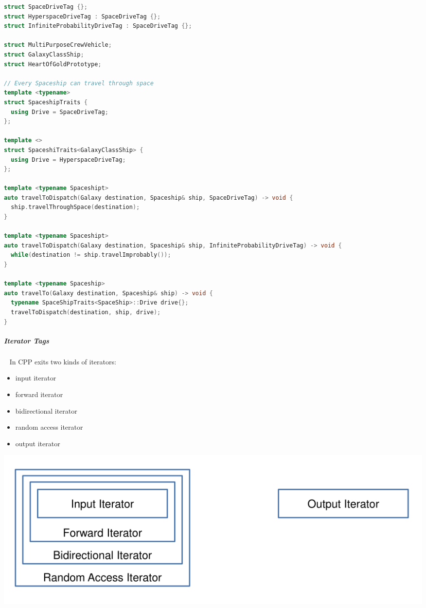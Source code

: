 \documentclass[11pt,twoside,landscape]{article}
\begin{document}
\begin{multicols}{2}
\begin{lstlisting}[language=c++,label=lst:orgdc64eac,caption={Tag for dispatching example},captionpos=b,numbers=none]
struct SpaceDriveTag {};
struct HyperspaceDriveTag : SpaceDriveTag {};
struct InfiniteProbabilityDriveTag : SpaceDriveTag {};

struct MultiPurposeCrewVehicle;
struct GalaxyClassShip;
struct HeartOfGoldPrototype;

// Every Spaceship can travel through space
template <typename>
struct SpaceshipTraits {
  using Drive = SpaceDriveTag;
};

template <>
struct SpaceshiTraits<GalaxyClassShip> {
  using Drive = HyperspaceDriveTag;
};

template <typename Spaceshipt>
auto travelToDispatch(Galaxy destination, Spaceship& ship, SpaceDriveTag) -> void {
  ship.travelThroughSpace(destination);
}

template <typename Spaceshipt>
auto travelToDispatch(Galaxy destination, Spaceship& ship, InfiniteProbabilityDriveTag) -> void {
  while(destination != ship.travelImprobably());
}

template <typename Spaceship>
auto travelTo(Galaxy destination, Spaceship& ship) -> void {
  typename SpaceShipTraits<SpaceShip>::Drive drive{};
  travelToDispatch(destination, ship, drive);
}
\end{lstlisting}

\subparagraph{Iterator Tags} \
\label{sec:orgb89cbb2}
In CPP exits two kinds of iterators:
\begin{itemize}
\item input iterator
\item forward iterator
\item bidirectional iterator
\item random access iterator
\item output iterator
\end{itemize}


{
\begin{center}
\includegraphics[width=.9\linewidth]{img/stl_iterator_categories.png}
\end{center}
\label{fig:stl-iterator-categories}
}


\end{multicols}
\end{document}
